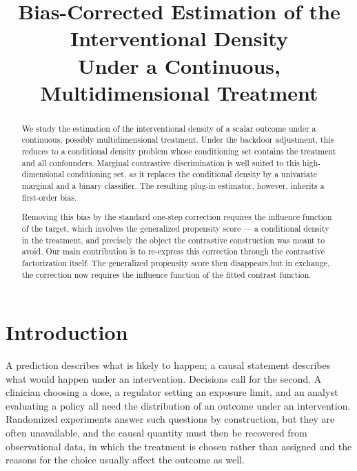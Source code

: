 \documentclass[11pt]{article}
\title{Bias-Corrected Estimation of the Interventional Density\\
Under a Continuous, Multidimensional Treatment}
\author{}
\date{}
\theoremstyle{plain}
\theoremstyle{definition}
\theoremstyle{remark}
\begin{document}
\maketitle

\begin{abstract}
We study the estimation of the interventional density of a scalar outcome under a
continuous, possibly multidimensional treatment. Under the backdoor adjustment, this
 reduces to a
conditional density problem whose conditioning set contains the treatment and all
confounders. Marginal contrastive discrimination is well suited to this high-dimensional
conditioning set, as it replaces the conditional density by a univariate marginal and a
binary classifier. The resulting plug-in estimator, however, inherits a first-order bias.

Removing this bias by the standard one-step correction requires the influence function of
the target, which involves the generalized propensity score --- a conditional density in
the treatment, and precisely the object the contrastive construction was meant to avoid.
Our main contribution is to re-express this correction through the contrastive
factorization itself. The generalized propensity score then disappears,but in exchange, the correction
now requires the influence function of the fitted contrast function. 


\end{abstract}

\section{Introduction}
\label{sec:intro}

A prediction describes what is likely to happen; a causal statement describes what would
happen under an intervention. Decisions call for the second. A clinician choosing a dose,
a regulator setting an exposure limit, and an analyst evaluating a policy all need the
distribution of an outcome under an intervention. Randomized experiments answer such questions
by construction, but they are often unavailable, and the causal quantity must then be
recovered from observational data, in which the treatment is chosen rather than assigned
and the reasons for the choice usually affect the outcome as well.
\end{document}

